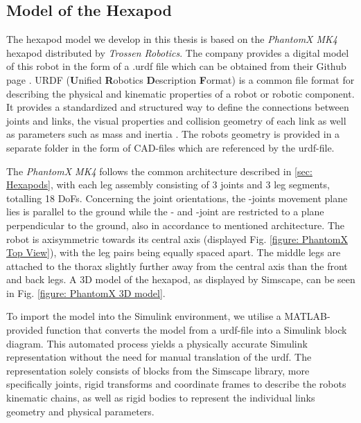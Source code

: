 \subsection{Model of the Hexapod}
The hexapod model we develop in this thesis is based on the \textit{PhantomX MK4} hexapod distributed by \textit{Trossen Robotics}.
The company provides a digital model of this robot in the form of a .urdf file which can be obtained from their Github page \parencite{interboticsGithub}.
URDF (\textbf{U}nified \textbf{R}obotics \textbf{D}escription \textbf{F}ormat) is a common file format for describing the physical and kinematic properties of a robot or robotic component.
It provides a standardized and structured way to define the connections between joints and links, the visual properties and collision geometry of each link as well as parameters such as mass and inertia \parencite{matlabURDFDocumentation}.
The robots geometry is provided in a separate folder in the form of CAD-files which are referenced by the urdf-file.

The \textit{PhantomX MK4} follows the common architecture described in \ref{sec: Hexapods}, with each leg assembly consisting of 3 joints and 3 leg segments, totalling 18 DoFs.
Concerning the joint orientations, the \textalpha-joints movement plane lies is parallel to the ground while the \textbeta- and \textgamma-joint are restricted to a plane perpendicular to the ground, also in accordance to mentioned architecture.
The robot is axisymmetric towards its central axis (displayed Fig. \ref{figure: PhantomX Top View}), with the leg pairs being equally spaced apart.
The middle legs are attached to the thorax slightly further away from the central axis than the front and back legs.
A 3D model of the hexapod, as displayed by Simscape, can be seen in Fig. \ref{figure: PhantomX 3D model}.

To import the model into the Simulink environment, we utilise a MATLAB-provided function that converts the model from a urdf-file into a Simulink block diagram.
This automated process yields a physically accurate Simulink representation without the need for manual translation of the urdf.
The representation solely consists of blocks from the Simscape library, more specifically joints, rigid transforms and coordinate frames to describe the robots kinematic chains, as well as rigid bodies to represent the individual links geometry and physical parameters.

